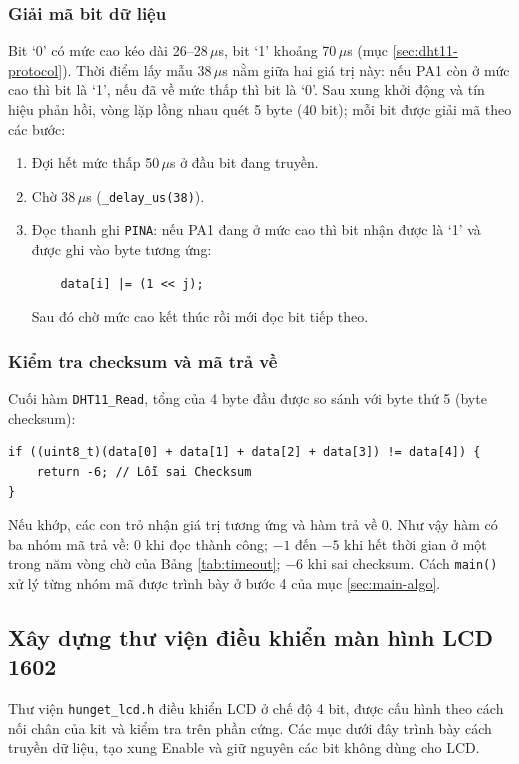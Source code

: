 \subsubsection{Giải mã bit dữ liệu}
Bit `0' có mức cao kéo dài 26--28\,$\mu$s, bit `1' khoảng 70\,$\mu$s (mục \ref{sec:dht11-protocol}). Thời điểm lấy mẫu 38\,$\mu$s nằm giữa hai giá trị này: nếu PA1 còn ở mức cao thì bit là `1', nếu đã về mức thấp thì bit là `0'. Sau xung khởi động và tín hiệu phản hồi, vòng lặp lồng nhau quét 5 byte (40 bit); mỗi bit được giải mã theo các bước:
\begin{enumerate}[leftmargin=1.2cm]
    \item Đợi hết mức thấp 50\,$\mu$s ở đầu bit đang truyền.
    \item Chờ 38\,$\mu$s (\texttt{\_delay\_us(38)}).
    \item Đọc thanh ghi \texttt{PINA}: nếu PA1 đang ở mức cao thì bit nhận được là `1' và được ghi vào byte tương ứng:
    \begin{samepage}
\begin{verbatim}
    data[i] |= (1 << j);
    \end{verbatim}
\par\end{samepage}
    Sau đó chờ mức cao kết thúc rồi mới đọc bit tiếp theo.
\end{enumerate}

\subsubsection{Kiểm tra checksum và mã trả về}
Cuối hàm \texttt{DHT11\_Read}, tổng của 4 byte đầu được so sánh với byte thứ 5 (byte checksum):
\begin{verbatim}
if ((uint8_t)(data[0] + data[1] + data[2] + data[3]) != data[4]) {
    return -6; // Lỗi sai Checksum
}
\end{verbatim}
Nếu khớp, các con trỏ nhận giá trị tương ứng và hàm trả về 0. Như vậy hàm có ba nhóm mã trả về: 0 khi đọc thành công; $-1$ đến $-5$ khi hết thời gian ở một trong năm vòng chờ của Bảng \ref{tab:timeout}; $-6$ khi sai checksum. Cách \texttt{main()} xử lý từng nhóm mã được trình bày ở bước 4 của mục \ref{sec:main-algo}.

\subsection{Xây dựng thư viện điều khiển màn hình LCD 1602}

Thư viện \texttt{hunget\_lcd.h} điều khiển LCD ở chế độ 4 bit, được cấu hình theo cách nối chân của kit và kiểm tra trên phần cứng. Các mục dưới đây trình bày cách truyền dữ liệu, tạo xung Enable và giữ nguyên các bit không dùng cho LCD.


